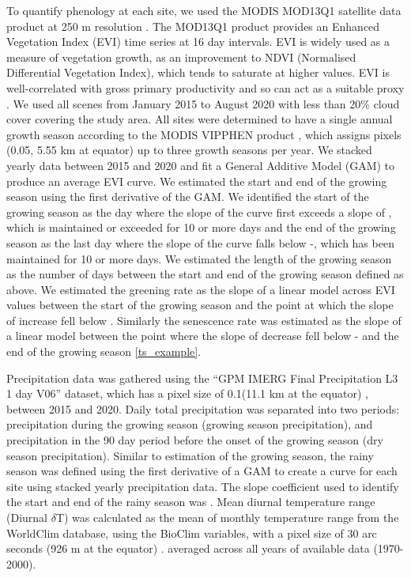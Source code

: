 \documentclass[11pt,a4paper]{article}
\begin{document}
To quantify phenology at each site, we used the MODIS MOD13Q1 satellite data product at 250 m resolution \citep{MOD13Q1}. The MOD13Q1 product provides an Enhanced Vegetation Index (EVI) time series at 16 day intervals. EVI is widely used as a measure of vegetation growth, as an improvement to NDVI (Normalised Differential Vegetation Index), which tends to saturate at higher values. EVI is well-correlated with gross primary productivity and so can act as a suitable proxy \citep{}. We used all scenes from January 2015 to August 2020 with less than 20\% cloud cover covering the study area. All sites were determined to have a single annual growth season according to the MODIS VIPPHEN product \citep{}, which assigns pixels (0.05\textdegree, 5.55 km at equator) up to three growth seasons per year. We stacked yearly data between 2015 and 2020 and fit a General Additive Model (GAM) to produce an average EVI curve. We estimated the start and end of the growing season using the first derivative of the GAM. We identified the start of the growing season as the day where the slope of the curve first exceeds a slope of \modisSLC{}, which is maintained or exceeded for 10 or more days and the end of the growing season as the last day where the slope of the curve falls below -\modisSLC{}, which has been maintained for 10 or more days. We estimated the length of the growing season as the number of days between the start and end of the growing season defined as above. We estimated the greening rate as the slope of a linear model across EVI values between the start of the growing season and the point at which the slope of increase fell below \modisSLC{}. Similarly the senescence rate was estimated as the slope of a linear model between the point where the slope of decrease fell below -\modisSLC{} and the end of the growing season \autoref{ts_example}.

Precipitation data was gathered using the ``GPM IMERG Final Precipitation L3 1 day V06'' dataset, which has a pixel size of 0.1\textdegree (11.1 km at the equator) \citep{GPM}, between 2015 and 2020. Daily total precipitation was separated into two periods: precipitation during the growing season (growing season precipitation), and precipitation in the 90 day period before the onset of the growing season (dry season precipitation). Similar to estimation of the growing season, the rainy season was defined using the first derivative of a GAM to create a curve for each site using stacked yearly precipitation data. The slope coefficient used to identify the start and end of the rainy season was \trmmSLC{}. Mean diurnal temperature range (Diurnal $\delta$T) was calculated as the mean of monthly temperature range from the WorldClim database, using the BioClim variables, with a pixel size of 30 arc seconds (926 m at the equator) \citep{Fick2017}. averaged across all years of available data (1970-2000).
\end{document}
